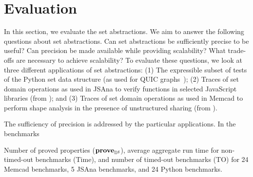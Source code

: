 \section{Evaluation}
\label{sec:evaluation}

In this section, we evaluate the set abstractions.  We aim to answer the following questions about set abstractions. Can set abstractions be sufficiently precise to be useful? Can precision be made available while providing scalability? What trade-offs are necessary to achieve scalability?  To evaluate these questions, we look at three different applications of set abstractions: (1) The expressible subset of tests of the Python set data structure (as used for QUIC graphs~\cite{ab:ecoop:13}); (2) Traces of set domain operations as used in JSAna to verify functions in selected JavaScript libraries (from \cite{hoo:14:sas,desync:15:esop}); and (3) Traces of set domain operations as used in Memcad to perform shape analysis in the presence of unstructured sharing (from \cite{memcad:15:sas}).

The sufficiency of precision is addressed by the particular applications.  In the benchmarks

\begin{table}[t]
\caption{Number of proved properties ($\textbf{prove}_{{\mathbb{D}}^{\sharp}}$), average aggregate run time for non-timed-out benchmarks (Time), and number of timed-out benchmarks (TO) for 24 Memcad benchmarks, 5 JSAna benchmarks, and 24 Python benchmarks.}
\label{tab:results}

\end{table}


